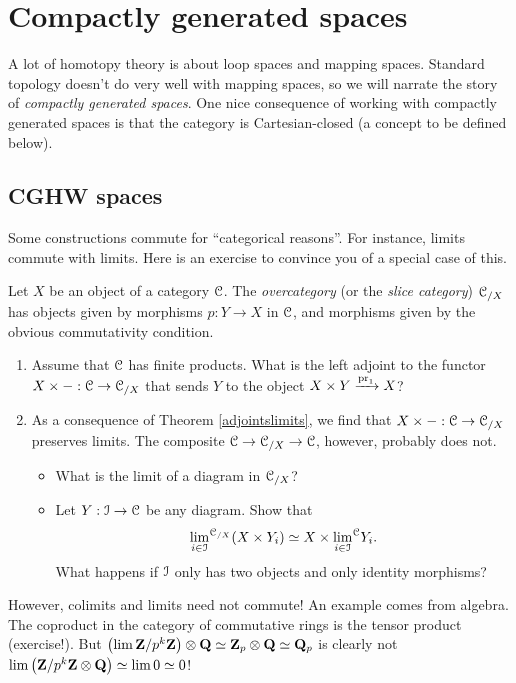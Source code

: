 \section{Compactly generated spaces}
A lot of homotopy theory is about loop spaces and mapping spaces.
Standard topology doesn't do very well with mapping spaces, so we will narrate the story of \emph{compactly generated spaces}.
One nice consequence of working with compactly generated spaces is that the category is
Cartesian-closed (a concept to be defined below).

\subsection{CGHW spaces}\label{CGWHspaces}
Some constructions commute for ``categorical reasons''.
For instance, limits commute with limits.
Here is an exercise to convince you of a special case of this.
\begin{exercise}%
    Let $X$ be an object of a category $\mathcal C$.
    The \emph{overcategory} (or the \emph{slice category}) $\mathcal C_{/X}$ has objects
    given by morphisms $p:Y\to X$ in $\mathcal C$, and morphisms given by the obvious
    commutativity condition.
    \begin{enumerate}
	\item Assume that $\mathcal C$ has finite products.
	    What is the left adjoint to the functor $X\times -:\mathcal C\to\mathcal C_{/X}$ that sends
	    $Y$ to the object $X\times Y \xrightarrow{{\mathrm{pr}_1}}X$?
	\item As a consequence of Theorem \ref{adjointslimits}, we find that $X\times -:\mathcal C\to\mathcal C_{/X}$ preserves limits.
	    The composite $\mathcal C\to\mathcal C_{/X}\to\mathcal C$, however, probably does not.
	    \begin{itemize}
		\item What is the limit of a diagram in $\mathcal C_{/X}$?
		\item Let $Y:\mathcal I\to\mathcal C$ be any diagram. Show that
		    $${\lim_{i\in\mathcal I}}^{\mathcal C_{/X}}(X\times Y_i)
		    \simeq X\times {\lim_{i\in\mathcal I}}^\mathcal C Y_i.$$
		    What happens if $\mathcal I$ only has two objects and only identity morphisms?
	    \end{itemize}
    \end{enumerate}
\end{exercise}
However, colimits and limits need not commute!
An example comes from algebra.
The coproduct in the category of commutative rings is the tensor product (exercise!).
But $\left(\lim \mathbf Z/p^k\mathbf Z\right) \otimes \mathbf Q \simeq \mathbf Z_p \otimes \mathbf Q \simeq \mathbf Q_p$ is
clearly not $\lim\left(\mathbf Z/p^k\mathbf Z\otimes \mathbf Q\right) \simeq \lim 0 \simeq 0$!

